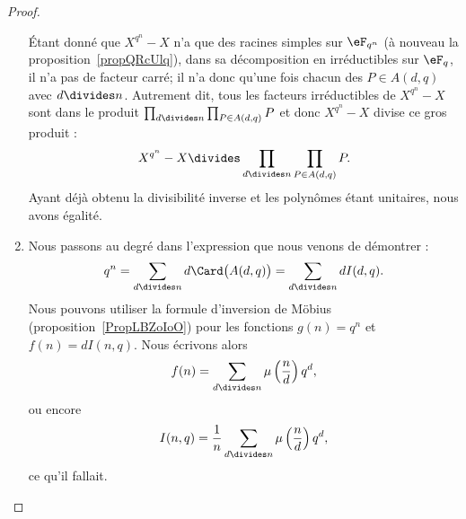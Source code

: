 \begin{proof}
\begin{enumerate}
		      Étant donné que \( X^{q^n}-X\) n'a que des racines simples sur \( \eF_{q^n}\) (à nouveau la proposition~\ref{propQRcUlq}), dans sa décomposition en irréductibles sur \( \eF_q\), il n'a pas de facteur carré; il n'a donc qu'une fois chacun des \( P\in A(d,q)\) avec \( d\divides n\). Autrement dit, tous les facteurs irréductibles de \( X^{q^n}-X\) sont dans le produit \( \prod_{d\divides n}\prod_{P\in A(d,q)}P\) et donc \( X^{q^n}-X\) divise ce gros produit :
		      \begin{equation}
			      X^{q^n}-X\divides \prod_{d\divides n}\prod_{P\in A(d,q)}P.
		      \end{equation}
		      Ayant déjà obtenu la divisibilité inverse et les polynômes étant unitaires, nous avons égalité.

		\item
		      Nous passons au degré dans l'expression que nous venons de démontrer :
		      \begin{equation}
			      q^n=\sum_{d\divides n}d\Card\big( A(d,q) \big)=\sum_{d\divides n}dI(d,q).
		      \end{equation}
		      Nous pouvons utiliser la formule d'inversion de Möbius (proposition~\ref{PropLBZoIoO}) pour les fonctions \( g(n)=q^n\) et \( f(n)=dI(n,q)\). Nous écrivons alors
		      \begin{equation}
			      f(n)=\sum_{d\divides n}\mu\left( \frac{ n }{ d } \right)q^d,
		      \end{equation}
		      ou encore
		      \begin{equation}
			      I(n,q)=\frac{1}{ n }\sum_{d\divides n}\mu\left( \frac{ n }{ d } \right)q^d,
		      \end{equation}
		      ce qu'il fallait.


\end{enumerate}
\end{proof}
